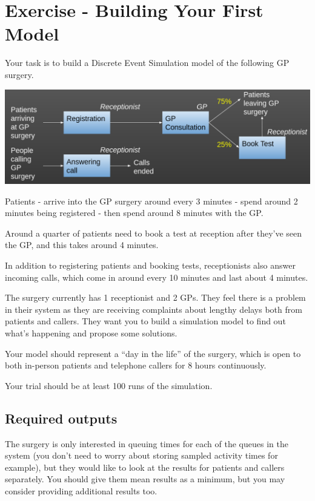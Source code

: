 \documentclass[
  letterpaper,
  DIV=11,
  numbers=noendperiod]{scrreprt}
\begin{document}
\chapter{Exercise - Building Your First
Model}\label{exercise---building-your-first-model}

Your task is to build a Discrete Event Simulation model of the following
GP surgery.

\includegraphics{images/exercise_gp.png}

Patients - arrive into the GP surgery around every 3 minutes - spend
around 2 minutes being registered - then spend around 8 minutes with the
GP.

Around a quarter of patients need to book a test at reception after
they've seen the GP, and this takes around 4 minutes.

In addition to registering patients and booking tests, receptionists
also answer incoming calls, which come in around every 10 minutes and
last about 4 minutes.

The surgery currently has 1 receptionist and 2 GPs. They feel there is a
problem in their system as they are receiving complaints about lengthy
delays both from patients and callers. They want you to build a
simulation model to find out what's happening and propose some
solutions.

Your model should represent a ``day in the life'' of the surgery, which
is open to both in-person patients and telephone callers for 8 hours
continuously.

Your trial should be at least 100 runs of the simulation.

\section{Required outputs}\label{required-outputs}

The surgery is only interested in queuing times for each of the queues
in the system (you don't need to worry about storing sampled activity
times for example), but they would like to look at the results for
patients and callers separately. You should give them mean results as a
minimum, but you may consider providing additional results too.
\end{document}
